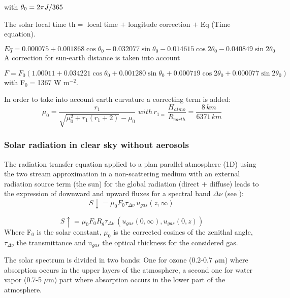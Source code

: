 with $\theta_{0}=2\pi J/365\\$

The solar local time th$= $ local time $+$ longitude correction $+$ Eq (Time
equation).

\begin{equation}
Eq=0.000075+0.001868\cos {\theta_{0}-0.032077\sin {\theta_{0}-0.014615\cos
{2\theta_{0}}}}-0.040849\sin {2\theta_{0}}
\end{equation}
A correction for sun-earth distance is taken into account

\begin{equation}
F=F_{0} (1.00011+0.034221\cos {\theta_{0}+0.001280\sin {\theta
_{0}+0.000719\cos {2\theta_{0}}}}+0.000077\sin {2\theta_{0}})
\end{equation}
with F$_{0}=$1367 W m$^{-2}$.

In order to take into account earth curvature a correcting term is
added:
\begin{equation}
\mu_{0}=\frac{r_{1}}{\sqrt {\mu_{0}^{2}+r_{1}(r_{1}+2)} -\mu_{0}}\, \,
with\, r_{1=}\, \frac{H_{atmo}}{R_{earth}}=\frac{8\, km}{6371\, km}
\end{equation}

\subsubsection{Solar radiation in clear sky without aerosols}
The radiation transfer equation applied to a plan parallel atmosphere (1D)
using the two stream approximation in a non-scattering medium with an
external radiation source term (the sun) for the global radiation (direct
$+$ diffuse) leads to the expression of downward and upward fluxes for a
spectral band $\Delta \nu $ (see \cite{Lacis:1974}):
\begin{equation}
S\downarrow =\mu_{0} F_{0} \tau_{\Delta \nu}\, u_{gas}\left( z,\infty
\right)\,
\end{equation}

\begin{equation}
S\uparrow =\mu_{0} F_{0} R_{g}\tau_{\Delta \nu}\, (u_{gas}(
0,\infty), u_{gas}(0,z))
\end{equation}
Where F$_{0}$ is the solar constant, $\mu_{0}$ is the corrected cosines of the
zenithal angle, $\tau_{\Delta \nu}$ the transmittance and u$_{gas}$ the
optical thickness for the considered gas.

The solar spectrum is divided in two bands: One for ozone (0.2-0.7 $\mu$m)
where absorption occurs in the upper layers of the atmosphere, a second one
for water vapor (0.7-5 $\mu$m) part where absorption occurs in the lower
part of the atmosphere.

